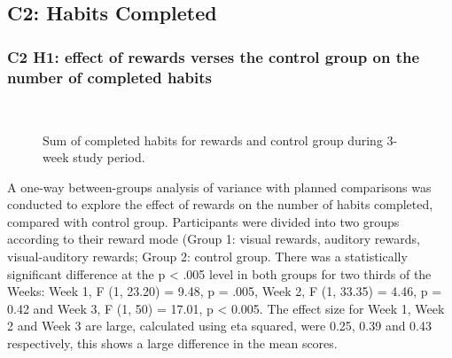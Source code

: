 \documentclass{scaffold/sigchi}
\begin{document}
\subsection{C2: Habits Completed}


\subsubsection{C2 H1: effect of rewards verses the control group on the number of completed habits}


\begin{figure}
  \centering
  \caption{Sum of completed habits for rewards and control group during 3-week study period.}~\label{fig:c2_h2}
\end{figure}

A one-way between-groups analysis of variance with planned comparisons was conducted to explore the effect of rewards on the number of habits completed, compared with control group. Participants were divided into two groups according to their reward mode (Group 1: visual rewards, auditory rewards, visual-auditory rewards; Group 2: control group. There was a statistically significant difference at the p < .005 level in both groups for two thirds of the Weeks: Week 1, F (1, 23.20) = 9.48, p = .005, Week 2, F (1, 33.35) = 4.46, p = 0.42 and Week 3, F (1, 50) = 17.01, p < 0.005. The effect size for Week 1, Week 2 and Week 3 are large, calculated using eta squared, were 0.25, 0.39 and 0.43 respectively, this shows a large difference in the mean scores.
\end{document}
